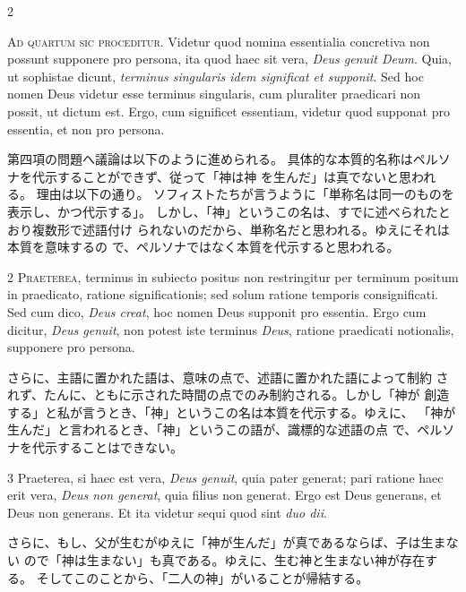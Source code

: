 \documentclass[paper=a4paper,fontsize=10pt,jafontsize=9pt,titlepage]{jlreq}
\begin{document}
\begin{paracol}{2}

{\Huge A}{\scshape d quartum sic proceditur}. Videtur quod nomina essentialia concretiva
non possunt supponere pro persona, ita quod haec sit vera, {\itshape Deus genuit
Deum}. Quia, ut sophistae dicunt, {\itshape terminus singularis idem significat et
supponit}. Sed hoc nomen Deus videtur esse terminus singularis, cum
pluraliter praedicari non possit, ut dictum est. Ergo, cum significet
essentiam, videtur quod supponat pro essentia, et non pro persona.

\switchcolumn

第四項の問題へ議論は以下のように進められる。
具体的な本質的名称はペルソナを代示することができず、従って「神は神
を生んだ」は真でないと思われる。
理由は以下の通り。
ソフィストたちが言うように「単称名は同一のものを表示し、かつ代示する」。
 しかし、「神」というこの名は、すでに述べられたとおり複数形で述語付け
 られないのだから、単称名だと思われる。ゆえにそれは本質を意味するの
 で、ペルソナではなく本質を代示すると思われる。

\switchcolumn*

2 {\scshape Praeterea}, terminus in subiecto positus non restringitur per terminum
positum in praedicato, ratione significationis; sed solum ratione
temporis consignificati. Sed cum dico, {\itshape Deus creat}, hoc nomen Deus
supponit pro essentia. Ergo cum dicitur, {\itshape Deus genuit}, non potest iste
terminus {\itshape Deus}, ratione praedicati notionalis, supponere pro persona.

\switchcolumn

さらに、主語に置かれた語は、意味の点で、述語に置かれた語によって制約
 されず、たんに、ともに示された時間の点でのみ制約される。しかし「神が
 創造する」と私が言うとき、「神」というこの名は本質を代示する。ゆえに、
 「神が生んだ」と言われるとき、「神」というこの語が、識標的な述語の点
 で、ペルソナを代示することはできない。

\switchcolumn*

3 Praeterea, si haec est vera, {\itshape Deus genuit}, quia pater generat; pari
ratione haec erit vera, {\itshape Deus non generat}, quia filius non generat. Ergo
est Deus generans, et Deus non generans. Et ita videtur sequi quod sint
{\itshape duo dii}.

\switchcolumn

さらに、もし、父が生むがゆえに「神が生んだ」が真であるならば、子は生まない
 ので「神は生まない」も真である。ゆえに、生む神と生まない神が存在する。
 そしてこのことから、「二人の神」がいることが帰結する。


\end{paracol}
\end{document}
